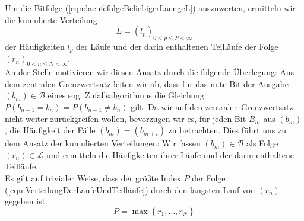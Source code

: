 \documentclass[11pt,oneside,a4paper]{scrreprt}
\begin{document}
\noindent Um die Bitfolge (\ref{eqn:laeufefolgeBeliebigerLaengeL}) auszuwerten, ermitteln wir die kumulierte Verteilung 
\begin{equation}\label{eqn:VerteilungDerLäufeUndTeilläufe}
L=(l_p)_{0<p\leq P<\infty}
\end{equation} 
der Häufigkeiten $l_p$ der Läufe und der darin enthaltenen Teilläufe der Folge $(r_n)_{0<n\leq N<\infty}$.\\
An der Stelle motivieren wir diesen Ansatz durch die folgende Überlegung: Aus dem zentralen Grenzwertsatz leiten wir ab, dass für das m.te Bit der Ausgabe $(b_m)\in \mathcal B$ eines sog. Zufallsalgorithmus die Gleichung $P(b_{n-1}=b_n)=P(b_{n-1}\neq b_n)$ gilt. Da wir auf den zentralen Grenzwertsatz nicht weiter zurückgreifen wollen, bevorzugen wir es, für jeden Bit $B_m$ aus $(b_m)$, die Häufigkeit der Fälle $(b_{m})=(b_{m+i})$ zu betrachten. Dies führt uns zu dem Ansatz der kumulierten Verteilungen: Wir fassen $(b_m)\in\mathcal B$ als Folge $(r_n)\in\mathcal L$ und ermitteln die Häufigkeiten ihrer Läufe und der darin enthaltene Teilläufe.\\
Es gilt auf trivialer Weise, dass der größte Index $P$ der Folge (\ref{eqn:VerteilungDerLäufeUndTeilläufe}) durch den längsten Lauf von $(r_n)$ gegeben ist. 
\begin{equation}\label{eqn:MaximaleLaengeVonL}
 P=\max\left\{ r_1,\dots, r_N\right\}
\end{equation}
\end{document}
